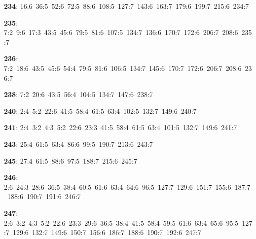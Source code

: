 \noindent \textbf{234}: 16:6\allowbreak\ 36:5\allowbreak\ 52:6\allowbreak\ 72:5\allowbreak\ 88:6\allowbreak\ 108:5\allowbreak\ 127:7\allowbreak\ 143:6\allowbreak\ 163:7\allowbreak\ 179:6\allowbreak\ 199:7\allowbreak\ 215:6\allowbreak\ 234:7\par
\noindent \textbf{235}: 7:2\allowbreak\ 9:6\allowbreak\ 17:3\allowbreak\ 43:5\allowbreak\ 45:6\allowbreak\ 79:5\allowbreak\ 81:6\allowbreak\ 107:5\allowbreak\ 134:7\allowbreak\ 136:6\allowbreak\ 170:7\allowbreak\ 172:6\allowbreak\ 206:7\allowbreak\ 208:6\allowbreak\ 235:7\par
\noindent \textbf{236}: 7:2\allowbreak\ 18:6\allowbreak\ 43:5\allowbreak\ 45:6\allowbreak\ 54:4\allowbreak\ 79:5\allowbreak\ 81:6\allowbreak\ 106:5\allowbreak\ 134:7\allowbreak\ 145:6\allowbreak\ 170:7\allowbreak\ 172:6\allowbreak\ 206:7\allowbreak\ 208:6\allowbreak\ 236:7\par
\noindent \textbf{238}: 7:2\allowbreak\ 20:6\allowbreak\ 43:5\allowbreak\ 56:4\allowbreak\ 104:5\allowbreak\ 134:7\allowbreak\ 147:6\allowbreak\ 238:7\par
\noindent \textbf{240}: 2:4\allowbreak\ 5:2\allowbreak\ 22:6\allowbreak\ 41:5\allowbreak\ 58:4\allowbreak\ 61:5\allowbreak\ 63:4\allowbreak\ 102:5\allowbreak\ 132:7\allowbreak\ 149:6\allowbreak\ 240:7\par
\noindent \textbf{241}: 2:4\allowbreak\ 3:2\allowbreak\ 4:3\allowbreak\ 5:2\allowbreak\ 22:6\allowbreak\ 23:3\allowbreak\ 41:5\allowbreak\ 58:4\allowbreak\ 61:5\allowbreak\ 63:4\allowbreak\ 101:5\allowbreak\ 132:7\allowbreak\ 149:6\allowbreak\ 241:7\par
\noindent \textbf{243}: 25:4\allowbreak\ 61:5\allowbreak\ 63:4\allowbreak\ 86:6\allowbreak\ 99:5\allowbreak\ 190:7\allowbreak\ 213:6\allowbreak\ 243:7\par
\noindent \textbf{245}: 27:4\allowbreak\ 61:5\allowbreak\ 88:6\allowbreak\ 97:5\allowbreak\ 188:7\allowbreak\ 215:6\allowbreak\ 245:7\par
\noindent \textbf{246}: 2:6\allowbreak\ 24:3\allowbreak\ 28:6\allowbreak\ 36:5\allowbreak\ 38:4\allowbreak\ 60:5\allowbreak\ 61:6\allowbreak\ 63:4\allowbreak\ 64:6\allowbreak\ 96:5\allowbreak\ 127:7\allowbreak\ 129:6\allowbreak\ 151:7\allowbreak\ 155:6\allowbreak\ 187:7\allowbreak\ 188:6\allowbreak\ 190:7\allowbreak\ 191:6\allowbreak\ 246:7\par
\noindent \textbf{247}: 2:6\allowbreak\ 3:2\allowbreak\ 4:3\allowbreak\ 5:2\allowbreak\ 22:6\allowbreak\ 23:3\allowbreak\ 29:6\allowbreak\ 36:5\allowbreak\ 38:4\allowbreak\ 41:5\allowbreak\ 58:4\allowbreak\ 59:5\allowbreak\ 61:6\allowbreak\ 63:4\allowbreak\ 65:6\allowbreak\ 95:5\allowbreak\ 127:7\allowbreak\ 129:6\allowbreak\ 132:7\allowbreak\ 149:6\allowbreak\ 150:7\allowbreak\ 156:6\allowbreak\ 186:7\allowbreak\ 188:6\allowbreak\ 190:7\allowbreak\ 192:6\allowbreak\ 247:7\par
